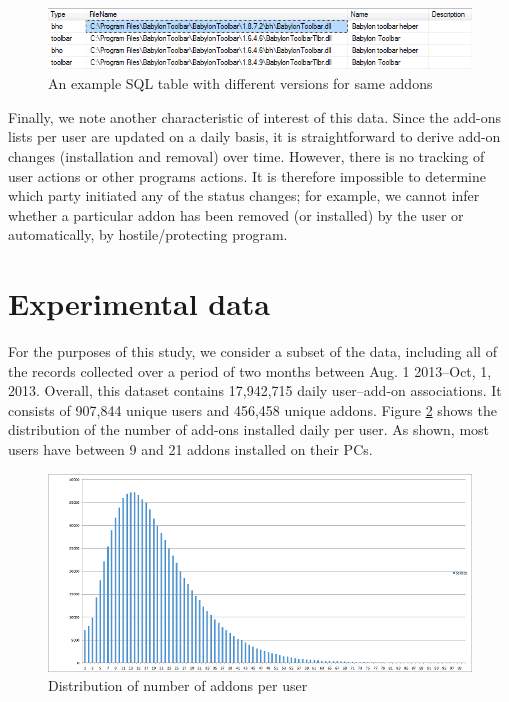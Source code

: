 \documentclass[11pt,oneside]{book}
\let\Oldsection\section
\renewcommand{\section}{\FloatBarrier\Oldsection}
\begin{document}
\begin{figure}[t]
\centering
\begin{small}
\includegraphics[scale=.8,angle=0]{figures/addons_versioning_snapshot.png}
\end{small}
\caption{An example SQL table with different versions for same addons}
\label{fig:addons_versioning_snapshot}
\end{figure}

Finally, we note another characteristic of interest of this data.  Since the add-ons lists per user are updated on a daily basis, it is straightforward to derive add-on changes (installation and removal) over time. However, there is no tracking of user actions or other programs actions. It is therefore impossible to determine which party initiated any of the status changes; for example, we cannot infer whether a particular addon has been removed (or installed) by the user or automatically, by hostile/protecting program. 

\section{Experimental data}

For the purposes of this study, we consider a subset of the data, including all of the records collected over a  period of two months between Aug. 1 2013--Oct, 1, 2013. Overall, this dataset contains 17,942,715 daily user--add-on associations. It consists of 907,844 unique users and 456,458 unique addons. Figure \ref{fig:user_addons_histogram} shows the distribution of the number of add-ons installed daily per user. As shown,  most users have between 9 and 21 addons installed on their PCs.

\begin{figure}[t]
\centering
\begin{small}
\includegraphics[scale=.9,angle=0]{figures/user_addons_histogram.png}
\end{small}
\caption{Distribution of number of addons per user}
\label{fig:user_addons_histogram}
\end{figure}
\end{document}
